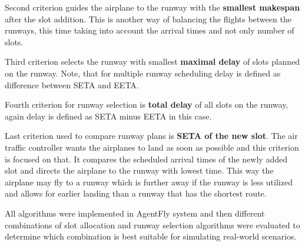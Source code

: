 \item Second criterion guides the airplane to the runway with the \textbf{smallest makespan} after the slot addition. This is another way of balancing the flights between the runways, this time taking into account the arrival times and not only number of slots.

\item Third criterion selects the runway with smallest \textbf{maximal delay} of slots planned on the runway. Note, that for multiple runway scheduling delay is defined as difference between SETA and EETA.

\item Fourth criterion for runway selection is \textbf{total delay} of all slots on the runway, again delay is defined as SETA minus EETA in this case. 

\item Last criterion used to compare runway plans is \textbf{SETA of the new slot}. The air traffic controller wants the airplanes to land as soon as possible and this criterion is focused on that. It compares the scheduled arrival times of the newly added slot and directs the airplane to the runway with lowest time. This way the airplane may fly to a runway which is further away if the runway is less utilized and allows for earlier landing than a runway that has the shortest route.
\eitem

All algorithms were implemented in AgentFly system and then different combinations of slot allocation and runway selection algorithms were evaluated to determine which combination is best suitable for simulating real-world scenarios.